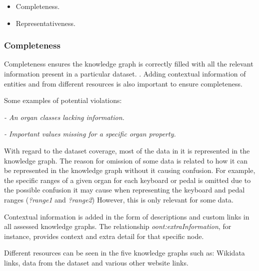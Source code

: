 \vspace{-0.2cm}
\begin{itemize}
\itemsep0em 
\item Completeness.
\vspace{-0.1cm}
\item Representativeness.
\end{itemize}
\vspace{-0.4cm}

\subsubsection{Completeness}
\hspace{0.5cm} Completeness ensures the knowledge graph is correctly filled with all the relevant information present in a particular dataset. \cite{knowledgegraphevaulationbook}. Adding contextual information of entities and from different resources \cite{evaluationpaper} is also important to ensure completeness. 

\noindent Some examples of potential violations:

\vspace{-0.1cm}
\begin{displayquote}
    \textit{- An organ classes lacking information.}
\end{displayquote}
\vspace{-0.6cm}
\begin{displayquote}
    \textit{- Important values missing for a specific organ property.}
\end{displayquote}
\vspace{-0.1cm}

With regard to the dataset coverage, most of the data in it is represented in the knowledge graph. The reason for omission of some data is related to how it can be represented in the knowledge graph without it causing confusion. For example, the specific ranges of a given organ for each keyboard or pedal is omitted due to the possible confusion it may cause when representing the keyboard and pedal ranges (\textit{?range1} and \textit{?range2}) However, this is only relevant for some data. 

Contextual information is added in the form of descriptions and custom links in all assessed knowledge graphs. The relationship \textit{oont:extraInformation}, for instance, provides context and extra detail for that specific node. 

Different resources can be seen in the five knowledge graphs such as: Wikidata links, data from the dataset and various other website links. 

